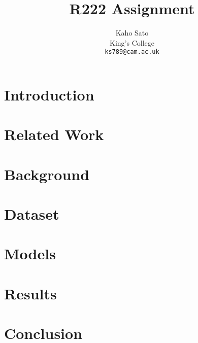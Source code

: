 \documentclass[11pt]{article}
\title{R222 Assignment}
\author{Kaho Sato \\
King's College \\
  {\tt ks789@cam.ac.uk}}
\date{}
\begin{document}
\maketitle

\section{Introduction}
\label{sec:introduction}


\section{Related Work}
\label{sec:related_work}


\section{Background}
\label{sec:background}


\section{Dataset}
\label{sec:dataset}


\section{Models}
\label{sec:architecture}


\section{Results}
\label{sec:results}


\section{Conclusion}
\label{sec:conclusion}



\nocite{*}

\end{document}
